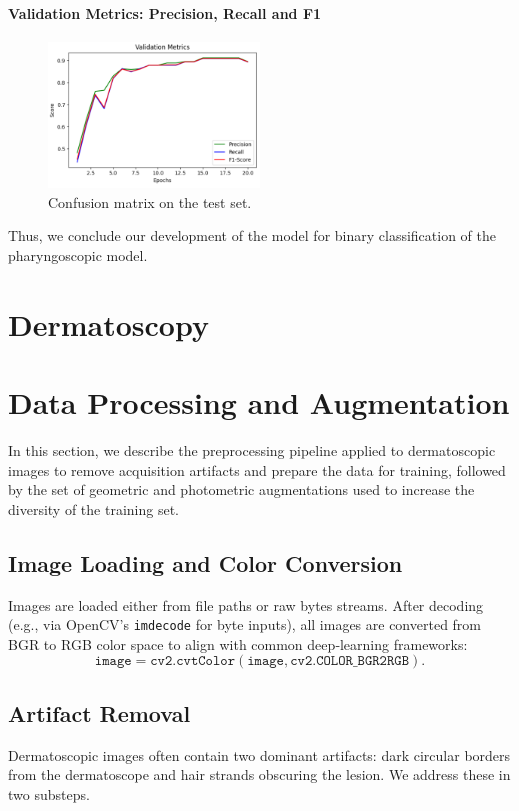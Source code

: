 \paragraph{Validation Metrics: Precision, Recall and F1}
\begin{figure}[h]
  \centering
  \includegraphics[width=0.5\textwidth]{images/phar_val_metrics.png}
  \caption{Confusion matrix on the test set.}
  \label{fig:phar_val_metrics}
\end{figure}
\par
 
Thus, we conclude our development of the model for binary classification of the pharyngoscopic model. 

\section{Dermatoscopy}

\section{Data Processing and Augmentation}

In this section, we describe the preprocessing pipeline applied to dermatoscopic images to remove acquisition artifacts and prepare the data for training, followed by the set of geometric and photometric augmentations used to increase the diversity of the training set.

\subsection{Image Loading and Color Conversion}
Images are loaded either from file paths or raw bytes streams. After decoding (e.g., via OpenCV’s \texttt{imdecode} for byte inputs), all images are converted from BGR to RGB color space to align with common deep‐learning frameworks:
\[
\texttt{image} = \texttt{cv2.cvtColor}(\texttt{image}, \texttt{cv2.COLOR\_BGR2RGB}).
\]

\subsection{Artifact Removal}
Dermatoscopic images often contain two dominant artifacts: dark circular borders from the dermatoscope and hair strands obscuring the lesion. We address these in two substeps.

